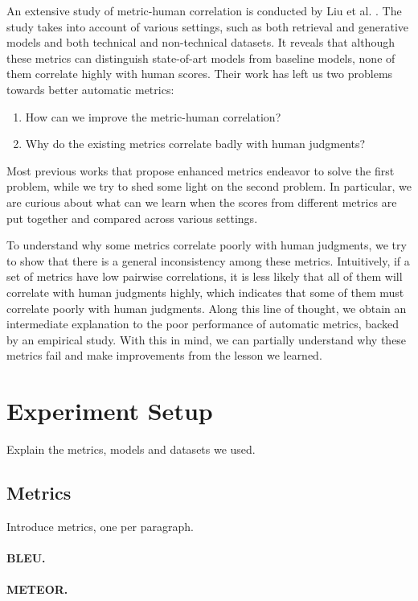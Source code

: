 \documentclass[runningheads]{llncs}
\begin{document}
    An extensive study of metric-human correlation is conducted by Liu et al. \cite{HowNot}. The study takes into account of various settings, such as both retrieval and generative models and both technical and non-technical datasets. It reveals that although these metrics can distinguish state-of-art models from baseline models, none of them correlate highly with human scores. Their work has left us two problems towards better automatic metrics:
    \begin{enumerate}
        \item How can we improve the metric-human correlation?
        \item Why do the existing metrics correlate badly with human judgments?
    \end{enumerate}
    Most previous works that propose enhanced metrics endeavor to solve the first problem, while we try to shed some light on the second problem. In particular, we are curious about what can we learn when the scores from different metrics are put together and compared across various settings.

    To understand why some metrics correlate poorly with human judgments, we try to show that there is a general inconsistency among these metrics. Intuitively, if a set of metrics have low pairwise correlations, it is less likely that all of them will correlate with human judgments highly, which indicates that some of them must correlate poorly with human judgments. Along this line of thought, we obtain an intermediate explanation to the poor performance of automatic metrics, backed by an empirical study. With this in mind, we can partially understand why these metrics fail and make improvements from the lesson we learned.

    \section{Experiment Setup}
    Explain the metrics, models and datasets we used.

    \subsection{Metrics}
    Introduce metrics, one per paragraph.
    \paragraph{BLEU.}
    \paragraph{METEOR.}
\end{document}
